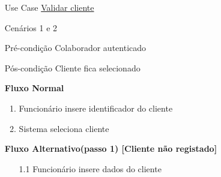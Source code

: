\documentclass[../relatorio.tex]{subfiles}
\begin{document}
\begin{itemize}
    \item[Use Case] {\underline{Validar cliente}}
    \item[Cenários] {1 e 2}
    \item[Pré-condição] {Colaborador autenticado}
    \item[Pós-condição] {Cliente fica selecionado}
          \begin{flushleft}
              \textbf{Fluxo Normal}
          \end{flushleft}
          \begin{enumerate}
              \item Funcionário insere identificador do cliente
              \item Sistema seleciona cliente
          \end{enumerate}
          \begin{flushleft}
              \textbf{Fluxo Alternativo(passo 1) [Cliente não registado]}
          \end{flushleft}
          \begin{itemize}
              \item[1.1]{Funcionário insere dados do cliente}
          \end{itemize}
\end{itemize}
\end{document}
